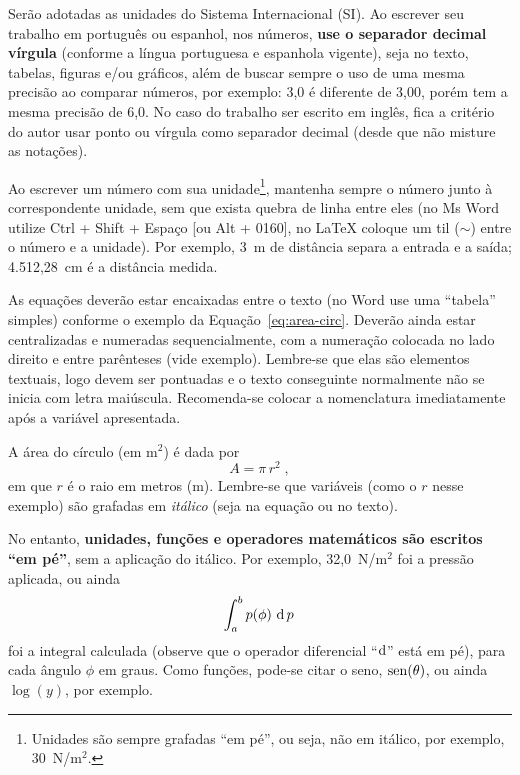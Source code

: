 \documentclass[12pt, a4paper, twoside, twocolumn]{article}
\begin{document}
Serão adotadas as unidades do Sistema Internacional (SI). Ao escrever seu trabalho em português ou espanhol, nos números, \textbf{use o separador decimal vírgula} (conforme a língua portuguesa e espanhola vigente), seja no texto, tabelas, figuras e/ou gráficos, além de buscar sempre o uso de uma mesma precisão ao comparar números, por exemplo: 3,0 é diferente de 3,00, porém tem a mesma precisão de 6,0. 
No caso do trabalho ser escrito em inglês, fica a critério do autor usar ponto ou vírgula como separador decimal (desde que não misture as notações).

Ao escrever um número com sua unidade\footnote{Unidades são sempre grafadas ``em pé'', ou seja, não em itálico, por exemplo, 30~N/m$^2$.}, mantenha sempre o número junto à correspondente unidade, sem que exista quebra de linha entre eles (no Ms Word utilize Ctrl + Shift + Espaço [ou Alt + 0160], no \LaTeX\xspace coloque um til ($\sim$) entre o número e a unidade). Por exemplo, 3~m de distância separa a entrada e a saída; 4.512,28~cm é a distância medida.

As equações deverão estar encaixadas entre o texto (no Word use uma ``tabela'' simples) conforme o exemplo da Equação~\eqref{eq:area-circ}. Deverão ainda estar centralizadas e numeradas sequencialmente, com a numeração colocada no lado direito e entre parênteses (vide exemplo). Lembre-se que elas são elementos textuais, logo devem ser pontuadas e o texto conseguinte normalmente não se inicia com letra maiúscula. Recomenda-se colocar a nomenclatura imediatamente após a variável apresentada.

A área do círculo (em m$^2$) é dada por 
\begin{equation}
	A = \pi \, r^2\;,
\label{eq:area-circ}
\end{equation}
%
em que $r$ é o raio em metros (m). Lembre-se que variáveis (como o $r$ nesse exemplo) são grafadas em \textit{itálico} (seja na equação ou no texto). 

No entanto, \textbf{unidades, funções e operadores matemáticos são escritos ``em pé''}, sem a aplicação do itálico. Por exemplo, 32,0~N/m$^2$ foi a pressão aplicada, ou ainda
%
\begin{equation}
	\int_a^b p(\phi)\, \operatorname{d} p\,
\label{eq:int}
\end{equation}
%
foi a integral calculada (observe que o operador diferencial ``$\text{d}$'' está em pé), para cada ângulo $\phi$ em graus. Como funções, pode-se citar o seno, $\operatorname{sen}(\theta)$, ou ainda $\log(y)$, por exemplo. 
%
\end{document}
